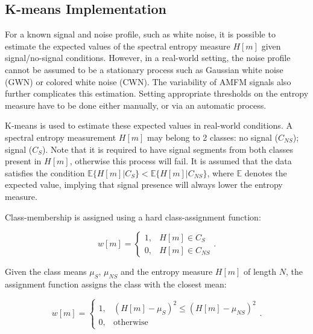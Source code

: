 \pagebreak
\begin{subappendices}
	\section{K-means Implementation}
	\label{app:kmeans}
	For a known signal and noise profile, such as white noise, it is possible to estimate the expected values of the spectral entropy measure $H[m]$ given signal/no-signal conditions. However, in a real-world setting, the noise profile cannot be assumed to be a stationary process such as Gaussian white noise (GWN) or colored white noise (CWN). The variability of AMFM signals also further complicates this estimation. Setting appropriate thresholds on the entropy measure have to be done either manually, or via an automatic process. 
	
	K-means is used to estimate these expected values in real-world conditions. A spectral entropy measurement $H[m]$ may belong to 2 classes: no signal ($C_{NS}$); signal ($C_S$). Note that it is required to have signal segments from both classes present in $H[m]$, otherwise this process will fail. It is assumed that the data satisfies the condition $\mathbb{E}\{H[m] | C_{S}\} < \mathbb{E}\{H[m] | C_{NS}\}$, where $\mathbb{E}$ denotes the expected value, implying that signal presence will always lower the entropy measure.
	
	Class-membership is assigned using a hard class-assignment function:
	
	\begin{equation*}
		w[m] = \begin{cases}
			1, & H[m] \in C_S\\
			0, & H[m] \in C_{NS}
		\end{cases}.
	\end{equation*}
	
	Given the class means $\mu_S$, $\mu_{NS}$ and the entropy measure $H[m]$ of length $N$, the assignment function assigns the class with the closest mean:
	
	\begin{equation} 
	\label{eqn:classassign}
		w[m] = \begin{cases}
			1, & (H[m] - \mu_S)^2 \leq (H[m] - \mu_{NS})^2 \\
			0, & \text{otherwise}
		\end{cases}.
	\end{equation}
	

\end{subappendices}

